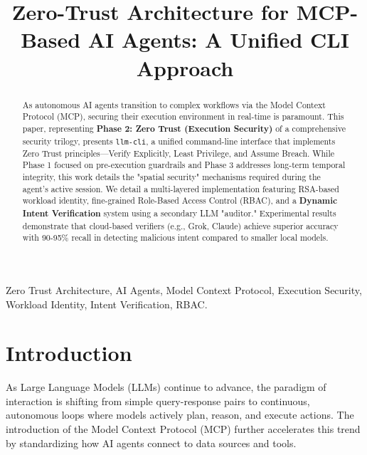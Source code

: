 \documentclass[conference]{IEEEtran}
\begin{document}
\title{Zero-Trust Architecture for MCP-Based AI Agents: A Unified CLI Approach}

\author{
}

\maketitle

\begin{abstract}
As autonomous AI agents transition to complex workflows via the Model Context Protocol (MCP), securing their execution environment in real-time is paramount. This paper, representing \textbf{Phase 2: Zero Trust (Execution Security)} of a comprehensive security trilogy, presents \texttt{llm-cli}, a unified command-line interface that implements Zero Trust principles---Verify Explicitly, Least Privilege, and Assume Breach. While Phase 1 focused on pre-execution guardrails and Phase 3 addresses long-term temporal integrity, this work details the "spatial security" mechanisms required during the agent's active session. We detail a multi-layered implementation featuring RSA-based workload identity, fine-grained Role-Based Access Control (RBAC), and a \textbf{Dynamic Intent Verification} system using a secondary LLM "auditor." Experimental results demonstrate that cloud-based verifiers (e.g., Grok, Claude) achieve superior accuracy with 90-95\% recall in detecting malicious intent compared to smaller local models.
\end{abstract}

\begin{IEEEkeywords}
Zero Trust Architecture, AI Agents, Model Context Protocol, Execution Security, Workload Identity, Intent Verification, RBAC.
\end{IEEEkeywords}

\section{Introduction}
As Large Language Models (LLMs) continue to advance, the paradigm of interaction is shifting from simple query-response pairs to continuous, autonomous loops where models actively plan, reason, and execute actions. The introduction of the Model Context Protocol (MCP) \cite{mcp} further accelerates this trend by standardizing how AI agents connect to data sources and tools.
\end{document}
